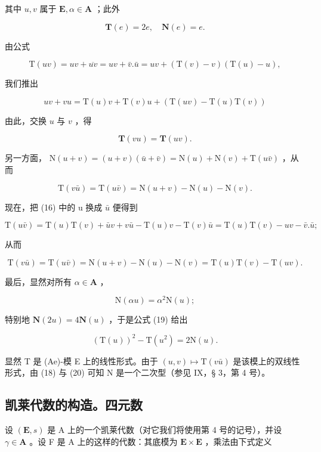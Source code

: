 其中 \(u, v\) 属于 \(\mathbf{E}, \alpha \in \mathbf{A}\) ；此外

\[
\mathbf {T} (e) = 2 e, \quad \mathbf {N} (e) = e.\tag{15}
\]

由公式

\[
\mathrm{T} (u v) = u v + \overline {{{{u v}}}} = u v + \bar {v}. \bar {u} = u v + (\mathrm{T} (v) - v) (\mathrm{T} (u) - u),
\]

我们推出

\[
u v + v u = \mathrm{T} (u) v + \mathrm{T} (v) u + (\mathrm{T} (u v) - \mathrm{T} (u) \mathrm{T} (v))\tag{16}
\]

由此，交换 \(u\) 与 \(v\) ，得

\[
\mathbf {T} (v u) = \mathbf {T} (u v).\tag{17}
\]

另一方面， \(\mathrm{N}(u+v)=(u+v)(\bar{u}+\bar{v})=\mathrm{N}(u)+\mathrm{N}(v)+\mathrm{T}(u\bar{v})\) ，从而

\[
\mathrm{T} (v \bar {u}) = \mathrm{T} (u \bar {v}) = \mathrm{N} (u + v) - \mathrm{N} (u) - \mathrm{N} (v).\tag{18}
\]

现在，把 (16) 中的 u 换成 \(\bar{u}\) 便得到

\[
\mathrm{T} (u \bar {v}) = \mathrm{T} (u) \mathrm{T} (v) + \bar {u} v + v \bar {u} - \mathrm{T} (u) v - \mathrm{T} (v) \bar {u} = \mathrm{T} (u) \mathrm{T} (v) - u v - \bar {v}. \bar {u};
\]

从而

\[
\mathrm{T} (v \bar {u}) = \mathrm{T} (u \bar {v}) = \mathrm{N} (u + v) - \mathrm{N} (u) - \mathrm{N} (v) = \mathrm{T} (u) \mathrm{T} (v) - \mathrm{T} (u v).\tag{19}
\]

最后，显然对所有 \(\alpha \in \mathbf{A}\) ，

\[
\mathrm{N} (\alpha u) = \alpha^ {2} \mathrm{N} (u);\tag{20}
\]

特别地 \(\mathbf{N}(2u) = 4\mathbf{N}(u)\) ，于是公式 (19) 给出

\[
(\mathrm{T} (u)) ^ {2} - \mathrm{T} (u ^ {2}) = 2 \mathrm{N} (u).\tag{21}
\]

显然 T 是 (Ae)-模 E 上的线性形式。由于 \((u, v) \mapsto \mathrm{T}(v\bar{u})\) 是该模上的双线性形式，由 (18) 与 (20) 可知 N 是一个二次型（参见 IX，§ 3，第 4 号）。

\subsection{凯莱代数的构造。四元数}

设 \((\mathbf{E}, s)\) 是 A 上的一个凯莱代数（对它我们将使用第 4 号的记号），并设 \(\gamma \in \mathbf{A}\) 。设 F 是 A 上的这样的代数：其底模为 \(\mathbf{E} \times \mathbf{E}\) ，乘法由下式定义

